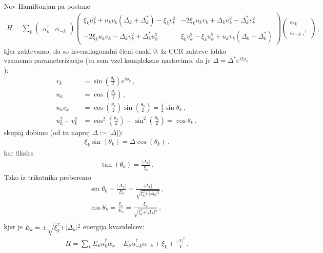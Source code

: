 \documentclass[a4paper,10pt]{article}
\begin{document}
Nov Hamiltonjan pa postane
\begin{align}
  H = \sum_k \begin{pmatrix} \alpha_k^\dagger & \alpha_{-k} \end{pmatrix}   \begin{pmatrix} \xi_k u_k^2 + u_k v_k (\Delta_k + \Delta_k^*) - \xi_k v_k^2 & -2\xi_k u_k v_k + \Delta_k u_k^2 - \Delta_k^* v_k^2 \\ -2\xi_k u_k v_k - \Delta_k v_k^2 + \Delta_k^* u_k^2 & \xi_k v_k^2 - \xi_k u_k^2 + u_k v_k (\Delta_k + \Delta_k^*) \end{pmatrix} \begin{pmatrix} \alpha_k \\ \alpha_{-k}\,,^\dagger \end{pmatrix}\,,
\end{align} 
kjer zahtevamo, da so izvendiagonalni členi enaki 0. Iz CCR zahteve lahko vzamemo parameterizacijo (tu sem vzel kompleksno nastavimo, da je $\Delta = \Delta^* e^{i2\phi_k}$):
\begin{align}
v_k &= \sin\left(\frac{\theta_k}{2}\right) e^{i\phi_k}\,, \\
u_k &= \cos\left(\frac{\theta_k}{2}\right)\,, \\
u_k v_k &= \cos\left(\frac{\theta_k}{2}\right) \sin\left(\frac{\theta_k}{2}\right) = \frac{1}{2} \sin\theta_k\,,\\
u_k^2 - v_k^2 &= \cos^2\left(\frac{\theta_k}{2}\right) - \sin^2\left(\frac{\theta_k}{2}\right) = \cos\theta_k\,,
\end{align}
skupaj dobimo (od tu naprej $\Delta := |\Delta|$): 
\begin{align}
  \xi_k \sin(\theta_k) =  \Delta \cos(\theta_k)\,.
\end{align}
kar fiksira 
\begin{align}
  \tan(\theta_k) = \frac{|\Delta_k|}{\xi_k}\,.
\end{align}
Tako iz trikotnika preberemo
\begin{align}
  \sin\theta_k = \frac{\vert{}\Delta_k\vert{}}{E_k} = \frac{\vert{}\Delta_k\vert{}}{\sqrt{\xi_k^2 + \vert{}\Delta_k\vert{}^2}}\,, \\
  \cos\theta_k = \frac{\xi_k}{E_k} = \frac{\xi_k}{\sqrt{\xi_k^2 + \vert{}\Delta_k\vert{}^2}}\,, \\
\end{align}
kjer je $E_k = \pm\sqrt{\xi_k^2 + \vert{}\Delta_k\vert{}^2}$ energija kvazidelcev:
\begin{align}
  H = \sum_k E_k \alpha_k^\dagger \alpha_k - E_k \alpha_{-k}^\dagger \alpha_{-k} + \xi_k +  \frac{|\Delta|^2}{V}\,.
\end{align} 
\end{document}
